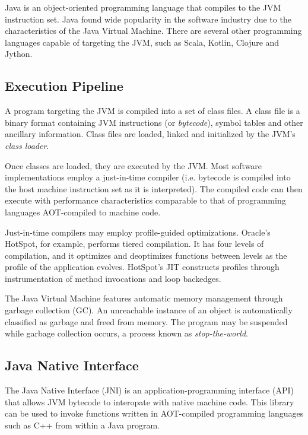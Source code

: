 Java is an object-oriented programming language that compiles to the JVM instruction set. Java found wide popularity in the software industry due to the characteristics of the Java Virtual Machine. There are several other programming languages capable of targeting the JVM, such as Scala, Kotlin, Clojure and Jython.

\subsection{Execution Pipeline}

A program targeting the JVM is compiled into a set of class files. A class file is a binary format containing JVM instructions (or \emph{bytecode}), symbol tables and other ancillary information. Class files are loaded, linked and initialized by the JVM's \emph{class loader}.

Once classes are loaded, they are executed by the JVM. Most software implementations employ a just-in-time compiler (i.e. bytecode is compiled into the host machine instruction set as it is interpreted). The compiled code can then execute with performance characteristics comparable to that of programming languages AOT-compiled to machine code.

Just-in-time compilers may employ profile-guided optimizations. Oracle's HotSpot, for example, performs tiered compilation. It has four levels of compilation, and it optimizes and deoptimizes functions between levels as the profile of the application evolves. HotSpot's JIT constructs profiles through instrumentation of method invocations and loop backedges.

The Java Virtual Machine features automatic memory management through garbage collection (GC). An unreachable instance of an object is automatically classified as garbage and freed from memory. The program may be suspended while garbage collection occurs, a process known as \emph{stop-the-world}.



\subsection{Java Native Interface}

The Java Native Interface (JNI) is an application-programming interface (API) that allows JVM bytecode to interopate with native machine code. This library can be used to invoke functions written in AOT-compiled programming languages such as C++ from within a Java program.

